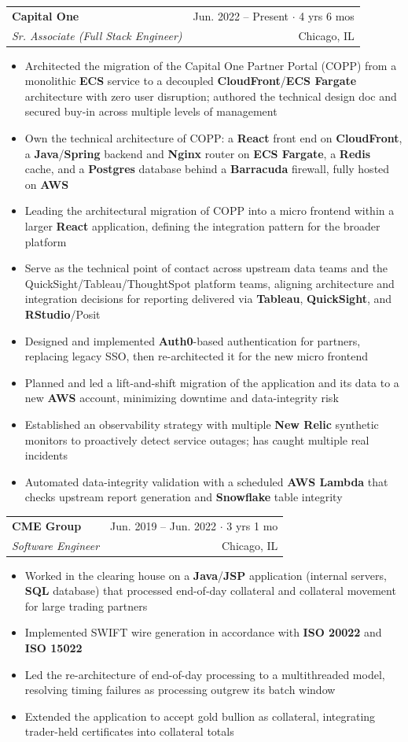 \documentclass[letterpaper,11pt]{article}
\makeatletter
\newcommand{\resumeItem}[1]{
    \item\small{
            {#1 \vspace{-1pt}}
    }
}
\newcommand{\resumeSubheading}[4]{
    \vspace{-1pt}\item
    \begin{tabular*}{\textwidth}[t]{l@{\extracolsep{\fill}}r}
        \textbf{#1} & {\color{dark-grey}\small #2}\vspace{1pt}\\ %
        \textit{#3} & {\color{dark-grey} \small #4}\\ %
    \end{tabular*}\vspace{-4pt}
}
\newcommand{\resumeItemListStart}{\begin{itemize}}
\newcommand{\resumeItemListEnd}{\end{itemize}\vspace{0pt}}
\makeatother
\begin{document}
\resumeSubheading
{Capital One}{Jun. 2022 -- Present $\cdot$ 4 yrs 6 mos}
{Sr. Associate (Full Stack Engineer)}{Chicago, IL}
\resumeItemListStart
\resumeItem{Architected the migration of the Capital One Partner Portal (COPP) from a monolithic \textbf{ECS} service to a decoupled \textbf{CloudFront}/\textbf{ECS Fargate} architecture with zero user disruption; authored the technical design doc and secured buy-in across multiple levels of management}
\resumeItem{Own the technical architecture of COPP: a \textbf{React} front end on \textbf{CloudFront}, a \textbf{Java}/\textbf{Spring} backend and \textbf{Nginx} router on \textbf{ECS Fargate}, a \textbf{Redis} cache, and a \textbf{Postgres} database behind a \textbf{Barracuda} firewall, fully hosted on \textbf{AWS}}
\resumeItem{Leading the architectural migration of COPP into a micro frontend within a larger \textbf{React} application, defining the integration pattern for the broader platform}
\resumeItem{Serve as the technical point of contact across upstream data teams and the QuickSight/Tableau/ThoughtSpot platform teams, aligning architecture and integration decisions for reporting delivered via \textbf{Tableau}, \textbf{QuickSight}, and \textbf{RStudio}/Posit}
\resumeItem{Designed and implemented \textbf{Auth0}-based authentication for partners, replacing legacy SSO, then re-architected it for the new micro frontend}
\resumeItem{Planned and led a lift-and-shift migration of the application and its data to a new \textbf{AWS} account, minimizing downtime and data-integrity risk}
\resumeItem{Established an observability strategy with multiple \textbf{New Relic} synthetic monitors to proactively detect service outages; has caught multiple real incidents}
\resumeItem{Automated data-integrity validation with a scheduled \textbf{AWS Lambda} that checks upstream report generation and \textbf{Snowflake} table integrity}
\resumeItemListEnd

\resumeSubheading
{CME Group}{Jun. 2019 -- Jun. 2022 $\cdot$ 3 yrs 1 mo}
{Software Engineer}{Chicago, IL}
\resumeItemListStart
\resumeItem{Worked in the clearing house on a \textbf{Java}/\textbf{JSP} application (internal servers, \textbf{SQL} database) that processed end-of-day collateral and collateral movement for large trading partners}
\resumeItem{Implemented SWIFT wire generation in accordance with \textbf{ISO 20022} and \textbf{ISO 15022}}
\resumeItem{Led the re-architecture of end-of-day processing to a multithreaded model, resolving timing failures as processing outgrew its batch window}
\resumeItem{Extended the application to accept gold bullion as collateral, integrating trader-held certificates into collateral totals}
\resumeItemListEnd
\end{document}
